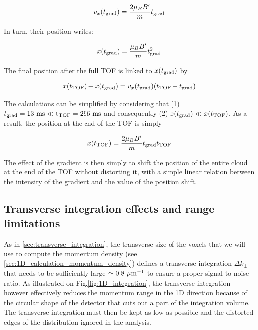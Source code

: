 \begin{equation}
    v_x(t_{\rm{grad}}) = \frac{2 \mu_B B'}{m} t_{\rm{grad}}
\end{equation}

\noindent In turn, their position writes:

\begin{equation}
    x(t_{\rm{grad}}) = \frac{\mu_B B'}{m} t_{\rm{grad}}^2
\end{equation}

\noindent The final position after the full TOF is linked to $x(t_{\rm{grad}})$ by

\begin{equation}
    x(t_{\rm{TOF}})-x(t_{\rm{grad}}) = v_x(t_{\rm{grad}}) (t_{\rm{TOF}}- t_{\rm{grad}})
\end{equation}

The calculations can be simplified by considering that (1) $t_{\rm{grad}} = 13 \ \rm{ms} \ll t_{\rm{TOF}} = 296 \ \rm{ms}$ and consequently (2) $x(t_{\rm{grad}}) \ll x(t_{\rm{TOF}})$. As a result, the position at the end of the TOF is simply

\begin{equation}
    x(t_{\rm{TOF}})= \frac{2 \mu_B B'}{m} t_{\rm{grad}} t_{\rm{TOF}}
\end{equation}

The effect of the gradient is then simply to shift the position of the entire cloud at the end of the TOF without distorting it, with a simple linear relation between the intensity of the gradient and the value of the position shift.

\subsection{Transverse integration effects and range limitations}

As in \ref{sec:transverse_integration}, the transverse size of the voxels that we will use to compute the momentum density (see \ref{sec:1D_calculation_momentum_density}) defines a transverse integration $\Delta k_{\perp}$ that needs to be sufficiently large $\simeq 0.8 \ \mu \rm{m^{-1}}$ to ensure a proper signal to noise ratio. As illustrated on Fig.\ref{fig:1D_integration}, the transverse integration however effectively reduces the momentum range in the 1D direction because of the circular shape of the detector that cuts out a part of the integration volume. The transverse integration must then be kept as low as possible and the distorted edges of the distribution ignored in the analysis. 

